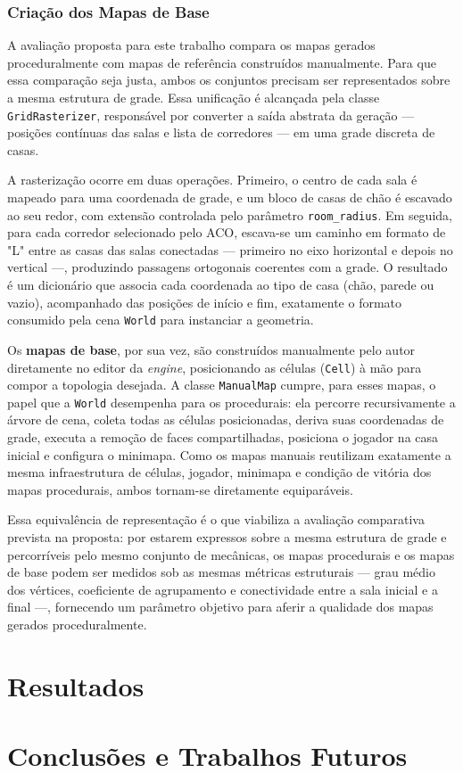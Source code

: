 \documentclass[12pt]{article}
\begin{document}
\subsubsection{Criação dos Mapas de Base}
A avaliação proposta para este trabalho compara os mapas gerados proceduralmente com mapas de referência construídos manualmente.
Para que essa comparação seja justa, ambos os conjuntos precisam ser representados sobre a mesma estrutura de grade. Essa
unificação é alcançada pela classe \texttt{GridRasterizer}, responsável por converter a saída abstrata da geração — posições
contínuas das salas e lista de corredores — em uma grade discreta de casas.
 
A rasterização ocorre em duas operações. Primeiro, o centro de cada sala é mapeado para uma coordenada de grade, e um bloco de
casas de chão é escavado ao seu redor, com extensão controlada pelo parâmetro \texttt{room\_radius}. Em seguida, para cada corredor
selecionado pelo ACO, escava-se um caminho em formato de "L" entre as casas das salas conectadas — primeiro no eixo horizontal e
depois no vertical —, produzindo passagens ortogonais coerentes com a grade. O resultado é um dicionário que associa cada
coordenada ao tipo de casa (chão, parede ou vazio), acompanhado das posições de início e fim, exatamente o formato consumido pela
cena \texttt{World} para instanciar a geometria.
 
Os \textbf{mapas de base}, por sua vez, são construídos manualmente pelo autor diretamente no editor da \textit{engine}, posicionando
as células (\texttt{Cell}) à mão para compor a topologia desejada. A classe \texttt{ManualMap} cumpre, para esses mapas, o papel
que a \texttt{World} desempenha para os procedurais: ela percorre recursivamente a árvore de cena, coleta todas as células
posicionadas, deriva suas coordenadas de grade, executa a remoção de faces compartilhadas, posiciona o jogador na casa inicial e
configura o minimapa. Como os mapas manuais reutilizam exatamente a mesma infraestrutura de células, jogador, minimapa e condição
de vitória dos mapas procedurais, ambos tornam-se diretamente equiparáveis.
 
Essa equivalência de representação é o que viabiliza a avaliação comparativa prevista na proposta: por estarem expressos sobre a
mesma estrutura de grade e percorríveis pelo mesmo conjunto de mecânicas, os mapas procedurais e os mapas de base podem ser
medidos sob as mesmas métricas estruturais — grau médio dos vértices, coeficiente de agrupamento e conectividade entre a sala
inicial e a final —, fornecendo um parâmetro objetivo para aferir a qualidade dos mapas gerados proceduralmente.


\section{Resultados}

\section{Conclusões e Trabalhos Futuros}




\end{document}
